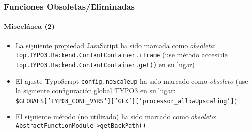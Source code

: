 \begin{frame}[fragile]
	\frametitle{Funciones Obsoletas/Eliminadas}
	\framesubtitle{Miscelánea (2)}


	\begin{itemize}

		\item La siguiente propiedad JavaScript ha sido marcada como \textit{obsoleta}:\newline
			\texttt{top.TYPO3.Backend.ContentContainer.iframe}\newline
			\smaller
				(use método accesible \texttt{top.TYPO3.Backend.ContentContainer.get()} en su lugar)
			\normalsize

		\item El ajuste TypoScript \texttt{config.noScaleUp} ha sido marcado como \textit{obsoleto}\newline
			\smaller
				(use la siguiente configuración global TYPO3 en su lugar:\newline
				\texttt{\$GLOBALS['TYPO3\_CONF\_VARS']['GFX']['processor\_allowUpscaling']})
			\normalsize

		\item El siguiente método (no utilizado) ha sido marcado como \textit{obsoleto}:\newline
			\texttt{AbstractFunctionModule->getBackPath()}

	\end{itemize}

\end{frame}






